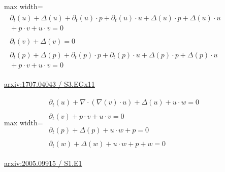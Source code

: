 \documentclass[10pt,a4paper]{article}
\begin{document}
\begin{minipage}{\linewidth}
\begin{center}\begin{adjustbox}{max width=\linewidth}$\displaystyle\begin{gathered}\begin{gathered}\partial_{t}(u)+\Delta(u)+\partial_{t}(u)\cdot p+\partial_{t}(u)\cdot u+\Delta(u)\cdot p+\Delta(u)\cdot u\\[-1pt]{}+p\cdot v+u\cdot v=0\end{gathered}\\[5pt]\begin{gathered}\partial_{t}(v)+\Delta(v)=0\end{gathered}\\[5pt]\begin{gathered}\partial_{t}(p)+\Delta(p)+\partial_{t}(p)\cdot p+\partial_{t}(p)\cdot u+\Delta(p)\cdot p+\Delta(p)\cdot u\\[-1pt]{}+p\cdot v+u\cdot v=0\end{gathered}\end{gathered}$\end{adjustbox}\end{center}
{\small \href{https://arxiv.org/html/1707.04043#S3.EGx11}{arxiv:1707.04043 / S3.EGx11}}\par
\end{minipage}\par\vspace{7mm}

\begin{minipage}{\linewidth}
\begin{center}\begin{adjustbox}{max width=\linewidth}$\displaystyle\begin{gathered}\begin{gathered}\partial_{t}(u)+\nabla\cdot(\nabla(v)\cdot u)+\Delta(u)+u\cdot w=0\end{gathered}\\[5pt]\begin{gathered}\partial_{t}(v)+p\cdot v+u\cdot v=0\end{gathered}\\[5pt]\begin{gathered}\partial_{t}(p)+\Delta(p)+u\cdot w+p=0\end{gathered}\\[5pt]\begin{gathered}\partial_{t}(w)+\Delta(w)+u\cdot w+p+w=0\end{gathered}\end{gathered}$\end{adjustbox}\end{center}
{\small \href{https://arxiv.org/html/2005.09915#S1.E1}{arxiv:2005.09915 / S1.E1}}\par
\end{minipage}\par\vspace{7mm}
\end{document}

